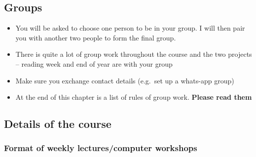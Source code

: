 \documentclass[
]{gitbook}
\providecommand{\tightlist}{%
  \setlength{\itemsep}{0pt}\setlength{\parskip}{0pt}}
\begin{document}
\hypertarget{groups}{%
\subsection{Groups}\label{groups}}

\begin{itemize}
\tightlist
\item
  You will be asked to choose one person to be in your group. I will then pair you with another two people to form the final group.
\item
  There is quite a lot of group work throughout the course and the two projects -- reading week and end of year are with your group
\item
  Make sure you exchange contact details (e.g.~set up a whats-app group)
\item
  At the end of this chapter is a list of rules of group work. \textbf{Please read them}
\end{itemize}

\hypertarget{details-of-the-course}{%
\subsection{Details of the course}\label{details-of-the-course}}

\hypertarget{format-of-weekly-lecturescomputer-workshops}{%
\subsubsection{Format of weekly lectures/computer workshops}\label{format-of-weekly-lecturescomputer-workshops}}
\end{document}
